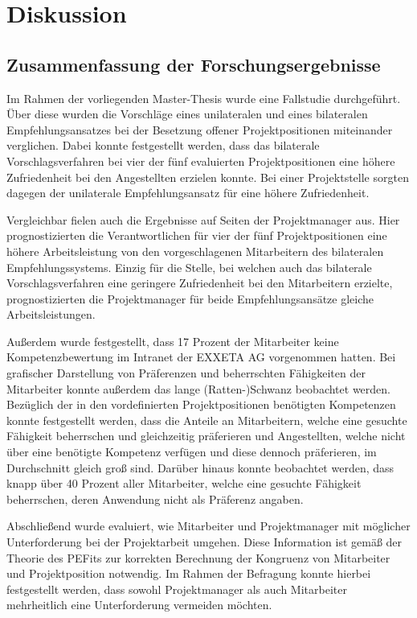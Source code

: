 \chapter{Diskussion}
\label{ch:diskussion}

\section{Zusammenfassung der Forschungsergebnisse}
\label{ch:diskussion:zusammenfassung}
Im Rahmen der vorliegenden Master-Thesis wurde eine Fallstudie durchgeführt. Über diese wurden die Vorschläge eines unilateralen und eines bilateralen Empfehlungsansatzes bei der Besetzung offener Projektpositionen miteinander verglichen. Dabei konnte festgestellt werden, dass das bilaterale Vorschlagsverfahren bei vier der fünf evaluierten Projektpositionen eine höhere Zufriedenheit bei den Angestellten erzielen konnte. Bei einer Projektstelle sorgten dagegen der unilaterale Empfehlungsansatz für eine höhere Zufriedenheit.

Vergleichbar fielen auch die Ergebnisse auf Seiten der Projektmanager aus. Hier prognostizierten die Verantwortlichen für vier der fünf Projektpositionen eine höhere Arbeitsleistung von den vorgeschlagenen Mitarbeitern des bilateralen Empfehlungssystems. Einzig für die Stelle, bei welchen auch das bilaterale Vorschlagsverfahren eine geringere Zufriedenheit bei den Mitarbeitern erzielte, prognostizierten die Projektmanager für beide Empfehlungsansätze gleiche Arbeitsleistungen.

Außerdem wurde festgestellt, dass 17 Prozent der Mitarbeiter keine Kompetenzbewertung im Intranet der EXXETA AG vorgenommen hatten. Bei grafischer Darstellung von Präferenzen und beherrschten Fähigkeiten der Mitarbeiter konnte außerdem das lange (Ratten-)Schwanz beobachtet werden. Bezüglich der in den vordefinierten Projektpositionen benötigten Kompetenzen konnte festgestellt werden, dass die Anteile an Mitarbeitern, welche eine gesuchte Fähigkeit beherrschen und gleichzeitig präferieren und Angestellten, welche nicht über eine benötigte Kompetenz verfügen und diese dennoch präferieren, im Durchschnitt gleich groß sind. Darüber hinaus konnte beobachtet werden, dass knapp über 40 Prozent aller Mitarbeiter, welche eine gesuchte Fähigkeit beherrschen, deren Anwendung nicht als Präferenz angaben.

Abschließend wurde evaluiert, wie Mitarbeiter und Projektmanager mit möglicher Unterforderung bei der Projektarbeit umgehen. Diese Information ist gemäß der Theorie des \acp{PEFit} zur korrekten Berechnung der Kongruenz von Mitarbeiter und Projektposition notwendig. Im Rahmen der Befragung konnte hierbei festgestellt werden, dass sowohl Projektmanager als auch Mitarbeiter mehrheitlich eine Unterforderung vermeiden möchten.

